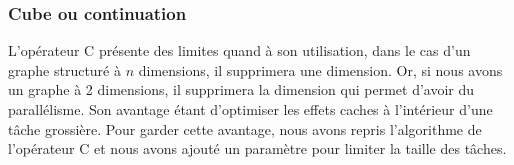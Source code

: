 \subsubsection{Cube ou continuation}
L'opérateur C présente des limites quand à son utilisation, dans le cas d'un graphe structuré à $n$ dimensions, il supprimera une dimension.
%
Or, si nous avons un graphe à 2 dimensions, il supprimera la dimension qui permet d'avoir du parallélisme.
%
Son avantage étant d'optimiser les effets caches à l'intérieur d'une tâche grossière.
%
Pour garder cette avantage, nous avons repris l'algorithme de l'opérateur C et nous avons ajouté un paramètre pour limiter la taille des tâches.
%
